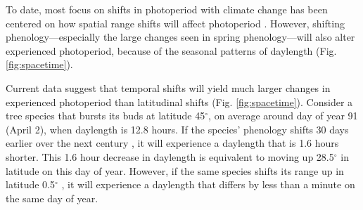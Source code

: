 \documentclass{article}
\begin{document}
\par To date, most focus on shifts in photoperiod with climate change has been centered on how spatial range shifts will affect photoperiod \citep[e.g.,][]{saikkonen2012,way2015}. However, shifting phenology---especially the large changes seen in spring phenology---will also alter experienced photoperiod, because of the seasonal patterns of daylength (Fig. \ref{fig:spacetime}). 

\par Current data suggest that temporal shifts will yield much larger changes in experienced photoperiod than latitudinal shifts (Fig. \ref{fig:spacetime}). %
Consider a tree species that bursts its buds at latitude 45$^{\circ}$, on average around day of year 91 (April 2), when daylength is 12.8 hours. If the species' phenology shifts 30 days earlier over the next century \citep[i.e., a rate of ~3 days per decade, as has been observed,][]{parmesan2003}, it will experience a daylength that is 1.6 hours shorter. This 1.6 hour decrease in daylength is equivalent to moving up 28.5$^{\circ}$ in latitude on this day of year. However, if the same species shifts its range up in latitude 0.5$^{\circ}$ \citep[i.e., 60 km over the next century, comparable to observed rates,][]{chen2011,parmesan2003}, it will experience a daylength that differs by less than a minute on the same day of year. 

\end{document}
